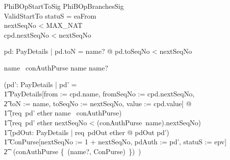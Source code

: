 \begin{LNewSDef}
\begin{schema}{PhiBOpStartToSig}
    PhiBOpBranchesSig \\
    ValidStartTo
\where
    statuS = eaFrom \\
    nextSeqNo < MAX\_NAT \\
    cpd.nextSeqNo < nextSeqNo
    \also

    \forall pd: PayDetails | pd.toN = name? @ pd.toSeqNo < nextSeqNo
    \also

    name \in \dom~conAuthPurse \implies name \neq name?
    \also

    (\exists pd': PayDetails | pd' = \\
        \t1 \theta PayDetails[from := cpd.name, fromSeqNo := cpd.nextSeqNo, \\
            \t2 toN := name, toSeqNo := nextSeqNo, 
            value := cpd.value] @ \\

        \t1 (req~pd' \notin ether \implies name \in \dom~conAuthPurse) \land \\

        \t1 (req~pd' \notin ether \implies nextSeqNo < (conAuthPurse~name).nextSeqNo) \land \\

        \t1 (\forall pdOut: PayDetails | req~pdOut \notin ether @ pdOut \neq pd') \land \\

        \t1 \lnot \theta ConPurse[nextSeqNo := 1 + nextSeqNo, pdAuth := pd', statuS := epv] \\
            \t2 \in \ran~(conAuthPurse \oplus \{~(name?, \theta ConPurse)~\})~)
\end{schema}~\end{LNewSDef}

